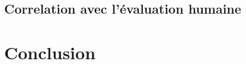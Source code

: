     \subsection{Correlation avec l'évaluation humaine}
    \label{subsec:main-automatic_evaluation_of_keyphrase_annotation-contributions-evaluation-correlation}


  \section{Conclusion}
  \label{sec:main-automatic_evaluation_of_keyphrase_annotation-Conclusion}

